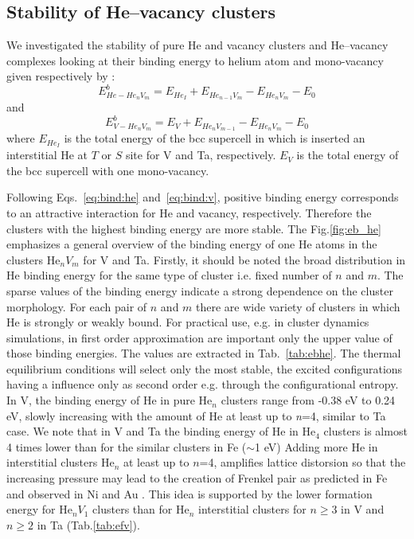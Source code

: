 \documentclass[a4,12pt,showpacs,preprintnumbers,amsmath,amssymb]{revtex4}
\begin{document}
\subsection{Stability of He--vacancy clusters}\label{binding}
We investigated the stability of pure He and vacancy clusters and He--vacancy complexes 
looking at their binding energy to helium atom and mono-vacancy given respectively by :
%
\begin{equation}
E^b_{He-He_nV_m} = E_{He_I} + E_{He_{n-1}V_m} - E_{He_nV_m} - E_0 
\label{eq:bind:he}
\end{equation}
%
and
%
\begin{equation}
  E^b_{V-He_nV_m} = E_V + E_{He_nV_{m-1}} - E_{He_nV_m} - E_0
\label{eq:bind:v}
\end{equation}
%
where  $E_{He_I}$ is the total energy of the bcc supercell in which is inserted an interstitial He at $T$ or $S$ site for V and Ta, respectively.
% 
$E_V$ is the total energy of the bcc supercell with one mono-vacancy.

Following Eqs.~\ref{eq:bind:he} and~\ref{eq:bind:v}, positive binding energy corresponds to an attractive interaction for He and vacancy, respectively.  
Therefore the clusters with the highest binding energy are more stable.
%
The Fig.\ref{fig:eb_he} emphasizes a general overview of the binding energy of one He atoms in the clusters He$_nV_m$ for V and Ta. 
Firstly, it should be noted the broad distribution in He binding energy for the same type of cluster i.e. fixed number of $n$ and $m$.  
The sparse values of the binding energy indicate a strong dependence on the cluster morphology. 
For each pair of $n$ and $m$ there are wide variety of clusters in which He is strongly or weakly bound. 
For practical use, e.g. in cluster dynamics simulations,  in first order approximation are important only 
the upper value of those binding energies. The values are extracted in Tab.~\ref{tab:ebhe}.  
The thermal equilibrium conditions  will select only the most stable, the excited configurations having a influence only as second order e.g. through the configurational entropy.     
%
In V, the binding energy of He in pure He$_n$ clusters range from -0.38 eV to 0.24 eV, slowly increasing with the amount of He 
at least up to \textit{n}=4, similar to Ta case. 
%
We note that in V and Ta the binding energy of He in He$_4$ clusters is almost 4 times lower than for the similar clusters in Fe ($\sim$1 eV)\cite{Fu2005}
%
Adding more He in interstitial clusters He$_n$ at least up to $n$=4, amplifies lattice distorsion so that 
the increasing pressure may lead to the creation of 
Frenkel pair as predicted in Fe \cite{FU2008335,Morishita2003,wilson1981} and observed in Ni \cite{thomas1979} 
and Au \cite{thomas1981}. This idea is supported by the lower formation energy for He$_{n}V_1$ clusters
than for He$_{n}$ interstitial clusters for $n\ge3$ in V and $n\ge2$ in Ta (Tab.\ref{tab:efv}).
%
\end{document}
